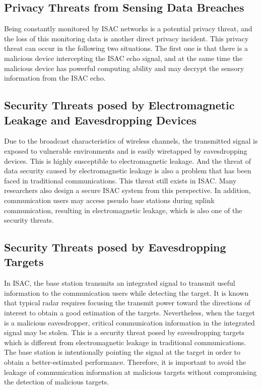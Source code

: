 \documentclass[10pt,journal,twocolumn,twoside]{IEEEtran} %
\begin{document}
\subsection{Privacy Threats from Sensing Data Breaches}
Being constantly monitored by ISAC networks is a potential privacy threat, and the loss of this monitoring data is another direct privacy incident. This privacy threat can occur in the following two situations. The first one is that there is a malicious device intercepting the ISAC echo signal, and at the same time the malicious device has powerful computing ability and may decrypt the sensory information from the ISAC echo.
\subsection{Security Threats posed by Electromagnetic Leakage and Eavesdropping Devices}
Due to the broadcast characteristics of wireless channels, the
transmitted signal is exposed to vulnerable environments and
is easily wiretapped by eavesdropping devices. This is highly susceptible to electromagnetic leakage. And the threat of data security caused by electromagnetic leakage is also a problem that has been faced in traditional communications. This threat still exists in ISAC. Many researchers also design a secure ISAC system from this perspective. In addition, communication users may access pseudo base stations during uplink communication, resulting in electromagnetic leakage, which is also one of the security threats.

\subsection{Security Threats posed by Eavesdropping Targets}

In ISAC, the base station transmits an integrated signal to transmit useful information to the communication users while detecting the target. It is known that typical radar requires focusing the transmit power toward the directions of interest to obtain a good estimation of the targets. Nevertheless, when the target is a malicious eavesdropper, critical communication information in the integrated signal may be stolen. This is a security threat posed by eavesdropping targets which is different from electromagnetic leakage in traditional communications. The base station is intentionally pointing the signal at the target in order to obtain a better-estimated performance. Therefore, it is important to avoid the leakage of communication information at malicious targets without compromising the detection of malicious targets. \cite{10143420,9199556,9737364,9747551}
\end{document}

